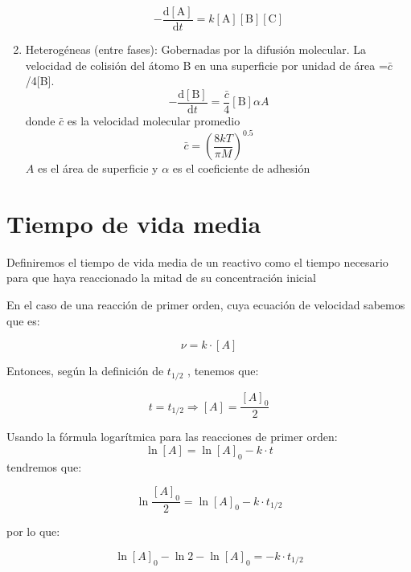 \begin{enumerate}

 \begin{equation*} -\frac{\mathrm{d}[\textrm{A}]}{\mathrm{d}t}=k[\textrm{A}][\textrm{B}][\textrm{C}]
 \end{equation*}
 
 \item Heterog\'eneas (entre fases): Gobernadas por la difusi\'on molecular. La velocidad de colisi\'on del \'atomo B en una superficie por unidad de \'area =$\bar{c}$/4[B]. 
\begin{equation*}
-\frac{\mathrm{d}[\textrm{B}]}{\mathrm{d}t}=\frac{\bar{c}}{4}[\textrm{B}]\alpha A
\end{equation*}
 donde $\bar{c}$ es la velocidad molecular promedio \begin{equation}
\bar{c}=\left(\frac{8kT}{\pi M}\right)^{0.5}
\end{equation}
$A$ es el \'area de superficie y $\alpha$ es el coeficiente de adhesi\'on
\end{enumerate}

\section{Tiempo de vida media}\label{TVDM}
Definiremos el tiempo de vida media de un reactivo como el tiempo necesario para que haya reaccionado la mitad de su concentración inicial

En el caso de una reacción de primer orden, cuya ecuación de velocidad sabemos que es: 

\begin{equation*}
\nu =k\cdot [A]
\end{equation*}

Entonces, según la definición de  $t_{1/2}$ , tenemos que:

\begin{equation*}
t=t_{1/2} \Longrightarrow  [A]=\frac{[A]_0}{2}
\end{equation*}

Usando la fórmula logarítmica para las reacciones de primer orden:
\begin{equation*}
\ln[A]=\ln[A]_0-k\cdot t
\end{equation*}
tendremos que: 

$$\ln\frac{[A]_0}{2}=\ln[A]_0-k\cdot t_{1/2}$$

por lo que:

$$\ln[A]_0-\ln2-\ln[A]_0=-k\cdot t_{1/2}$$

